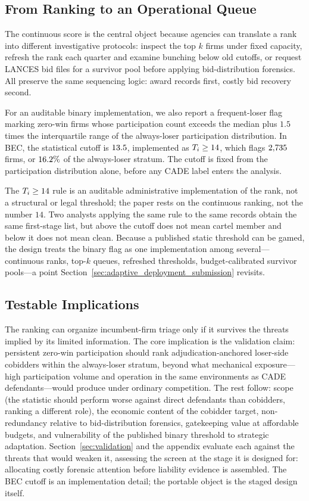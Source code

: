 \subsection{From Ranking to an Operational Queue}
\label{sec:award_rule}

The continuous score is the central object because agencies can
translate a rank into different investigative protocols: inspect
the top $k$ firms under fixed capacity, refresh the rank each
quarter and examine bunching below old cutoffs, or request LANCES
bid files for a survivor pool before applying bid-distribution
forensics. All preserve the same sequencing logic: award records
first, costly bid recovery second.

For an auditable binary implementation, we also report a
frequent-loser flag marking zero-win firms whose participation
count exceeds the median plus $1.5$ times the interquartile range
of the always-loser participation distribution. In BEC, the
statistical cutoff is $13.5$, implemented as
$T_i\geq14$, which flags $2{,}735$ firms, or
$16.2\%$ of the always-loser stratum. The cutoff is fixed
from the participation distribution alone, before any CADE label
enters the analysis.

The $T_i\geq14$ rule is an auditable administrative
implementation of the rank, not a structural or legal threshold; the
paper rests on the continuous ranking, not the number $14$. Two
analysts applying the same rule to the same records obtain the same
first-stage list, but above the cutoff does not mean cartel member and
below it does not mean clean. Because a published static threshold can
be gamed, the design treats the binary flag as one implementation among
several---continuous ranks, top-$k$ queues, refreshed thresholds,
budget-calibrated survivor pools---a point
Section~\ref{sec:adaptive_deployment_submission} revisits.

\subsection{Testable Implications}
\label{sec:testable_implications}

%
The ranking can organize incumbent-firm triage only if it survives the
threats implied by its limited information. The core implication is the
validation claim: persistent zero-win participation should rank
adjudication-anchored loser-side cobidders within the always-loser
stratum, beyond what mechanical exposure---high participation volume
and operation in the same environments as CADE defendants---would
produce under ordinary competition. The rest follow: scope (the
statistic should perform worse against direct defendants than
cobidders, ranking a different role), the economic content of the
cobidder target, non-redundancy relative to bid-distribution forensics,
gatekeeping value at affordable budgets, and vulnerability of the
published binary threshold to strategic adaptation.
Section~\ref{sec:validation} and the appendix evaluate each against the
threats that would weaken it, assessing the screen at the stage it is
designed for: allocating costly forensic attention before liability
evidence is assembled. The BEC cutoff is an implementation detail; the
portable object is the staged design itself.
